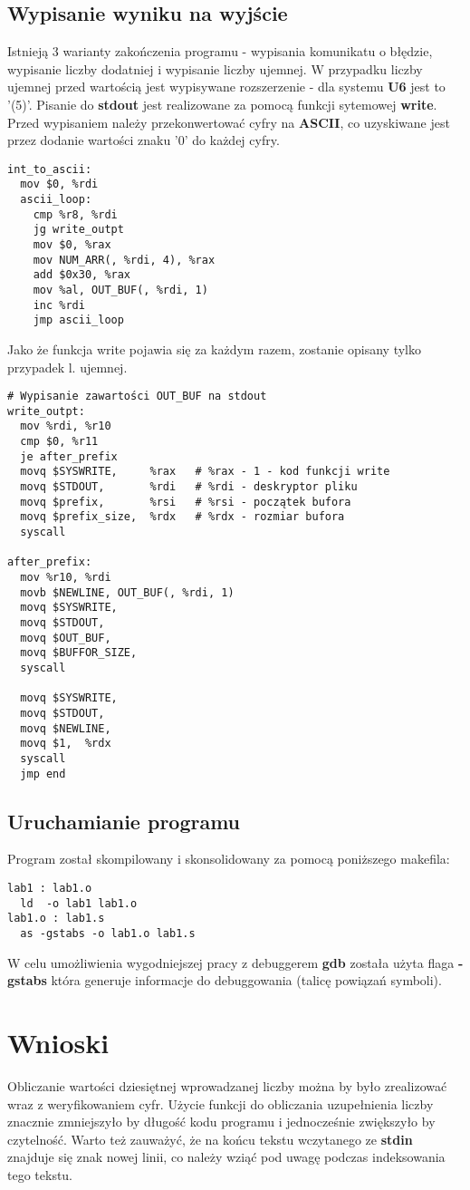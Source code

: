\documentclass[11pt]{report}
\begin{document}
\subsection{Wypisanie wyniku na wyjście}
Istnieją 3 warianty zakończenia programu - wypisania komunikatu o błędzie, wypisanie liczby dodatniej i wypisanie liczby ujemnej. W przypadku liczby ujemnej przed wartością jest wypisywane rozszerzenie - dla systemu \textbf{U6} jest to '(5)'. Pisanie do \textbf{stdout} jest realizowane za pomocą funkcji sytemowej \textbf{write}. Przed wypisaniem należy przekonwertować cyfry na \textbf{ASCII}, co uzyskiwane jest przez dodanie wartości znaku '0' do każdej cyfry.
\begin{verbatim}
int_to_ascii:
  mov $0, %rdi
  ascii_loop:
    cmp %r8, %rdi               
    jg write_outpt
    mov $0, %rax
    mov NUM_ARR(, %rdi, 4), %rax  
    add $0x30, %rax               
    mov %al, OUT_BUF(, %rdi, 1)
    inc %rdi
    jmp ascii_loop
\end{verbatim}
Jako że funkcja write pojawia się za każdym razem, zostanie opisany tylko przypadek l. ujemnej.
\begin{verbatim}
# Wypisanie zawartości OUT_BUF na stdout
write_outpt:
  mov %rdi, %r10
  cmp $0, %r11
  je after_prefix
  movq $SYSWRITE,     %rax   # %rax - 1 - kod funkcji write
  movq $STDOUT,       %rdi   # %rdi - deskryptor pliku
  movq $prefix,       %rsi   # %rsi - początek bufora
  movq $prefix_size,  %rdx   # %rdx - rozmiar bufora
  syscall

after_prefix:
  mov %r10, %rdi
  movb $NEWLINE, OUT_BUF(, %rdi, 1)
  movq $SYSWRITE,    
  movq $STDOUT,       
  movq $OUT_BUF,      
  movq $BUFFOR_SIZE,  
  syscall

  movq $SYSWRITE,   
  movq $STDOUT,      
  movq $NEWLINE,     
  movq $1,  %rdx
  syscall
  jmp end
\end{verbatim}
\subsection{Uruchamianie programu}
Program został skompilowany i skonsolidowany za pomocą poniższego makefila:
\begin{verbatim}
lab1 : lab1.o
  ld  -o lab1 lab1.o
lab1.o : lab1.s
  as -gstabs -o lab1.o lab1.s
\end{verbatim}
W celu umożliwienia wygodniejszej pracy z debuggerem \textbf{gdb} została użyta flaga \textbf{-gstabs} która generuje informacje do debuggowania (talicę powiązań symboli).
\section{Wnioski}
Obliczanie wartości dziesiętnej wprowadzanej liczby można by było zrealizować wraz z weryfikowaniem cyfr. Użycie funkcji do obliczania uzupełnienia liczby znacznie zmniejszyło by długość kodu programu i jednocześnie zwiększyło by czytelność. Warto też zauważyć, że na końcu tekstu wczytanego ze \textbf{stdin} znajduje się znak  nowej linii, co należy wziąć pod uwagę podczas indeksowania tego tekstu.
\label{sec:wnioski}
\end{document}
